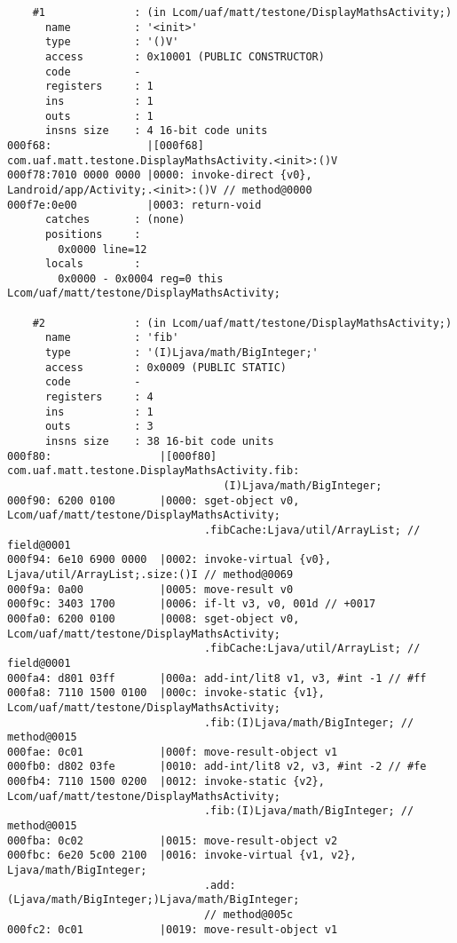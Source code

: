 \begin{lstlisting}
    #1              : (in Lcom/uaf/matt/testone/DisplayMathsActivity;)
      name          : '<init>'
      type          : '()V'
      access        : 0x10001 (PUBLIC CONSTRUCTOR)
      code          -
      registers     : 1
      ins           : 1
      outs          : 1
      insns size    : 4 16-bit code units
000f68:               |[000f68] com.uaf.matt.testone.DisplayMathsActivity.<init>:()V
000f78:7010 0000 0000 |0000: invoke-direct {v0}, Landroid/app/Activity;.<init>:()V // method@0000
000f7e:0e00           |0003: return-void
      catches       : (none)
      positions     :
        0x0000 line=12
      locals        :
        0x0000 - 0x0004 reg=0 this Lcom/uaf/matt/testone/DisplayMathsActivity;

    #2              : (in Lcom/uaf/matt/testone/DisplayMathsActivity;)
      name          : 'fib'
      type          : '(I)Ljava/math/BigInteger;'
      access        : 0x0009 (PUBLIC STATIC)
      code          -
      registers     : 4
      ins           : 1
      outs          : 3
      insns size    : 38 16-bit code units
000f80:                 |[000f80] com.uaf.matt.testone.DisplayMathsActivity.fib:
                                  (I)Ljava/math/BigInteger;
000f90: 6200 0100       |0000: sget-object v0, Lcom/uaf/matt/testone/DisplayMathsActivity;
                               .fibCache:Ljava/util/ArrayList; // field@0001
000f94: 6e10 6900 0000  |0002: invoke-virtual {v0}, Ljava/util/ArrayList;.size:()I // method@0069
000f9a: 0a00            |0005: move-result v0
000f9c: 3403 1700       |0006: if-lt v3, v0, 001d // +0017
000fa0: 6200 0100       |0008: sget-object v0, Lcom/uaf/matt/testone/DisplayMathsActivity;
                               .fibCache:Ljava/util/ArrayList; // field@0001
000fa4: d801 03ff       |000a: add-int/lit8 v1, v3, #int -1 // #ff
000fa8: 7110 1500 0100  |000c: invoke-static {v1}, Lcom/uaf/matt/testone/DisplayMathsActivity;
                               .fib:(I)Ljava/math/BigInteger; // method@0015
000fae: 0c01            |000f: move-result-object v1
000fb0: d802 03fe       |0010: add-int/lit8 v2, v3, #int -2 // #fe
000fb4: 7110 1500 0200  |0012: invoke-static {v2}, Lcom/uaf/matt/testone/DisplayMathsActivity;
                               .fib:(I)Ljava/math/BigInteger; // method@0015
000fba: 0c02            |0015: move-result-object v2
000fbc: 6e20 5c00 2100  |0016: invoke-virtual {v1, v2}, Ljava/math/BigInteger;
                               .add:(Ljava/math/BigInteger;)Ljava/math/BigInteger;
                               // method@005c
000fc2: 0c01            |0019: move-result-object v1

\end{lstlisting}
